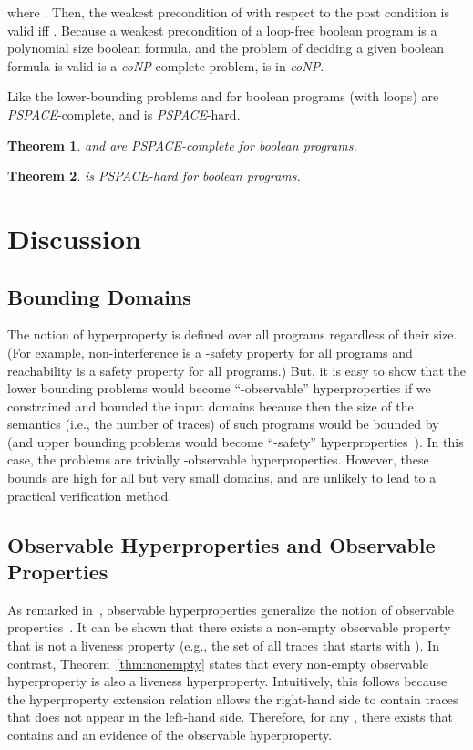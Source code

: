 \documentclass[]{eptcs}
\newtheorem{theorem}{Theorem}[section]
\begin{document}
where .  Then, the weakest precondition of
 with respect to the post
condition  is
valid iff .  Because a weakest precondition of a
loop-free boolean program is a polynomial size boolean formula, and
the problem of deciding a given boolean formula is valid is a {\it
  coNP}-complete problem,  is in {\it coNP}.

Like the lower-bounding problems  and
 for boolean programs (with loops) are {\it
  PSPACE}-complete, and  is {\it PSPACE}-hard.
\begin{theorem}
\label{thm:umeugepspace}
   and  are {\it
    PSPACE}-complete for boolean programs.
\end{theorem}
\begin{theorem}
\label{thm:usepspace}
 is {\it PSPACE}-hard for boolean programs.
\end{theorem}

\section{Discussion}

\subsection{Bounding Domains}

\label{sec:bounddomain}
The notion of hyperproperty is defined over all programs regardless of
their size. (For example, non-interference is a -safety property
for all programs and reachability is a safety property for all
programs.) But, it is easy to show that the lower bounding problems
would become ``-observable'' hyperproperties if we constrained and
bounded the input domains because then the size of the semantics
(i.e., the number of traces) of such programs would be bounded by
 (and upper bounding problems would become
``-safety''
hyperproperties~\cite{DBLP:conf/esorics/YasuokaT10}). In this case,
the problems are trivially -observable hyperproperties.
However, these bounds are high for all but very small domains, and are
unlikely to lead to a practical verification method.


\subsection{Observable Hyperproperties and Observable Properties}
As remarked in~\cite{DBLP:journals/jcs/ClarksonS10}, observable
hyperproperties generalize the notion of observable
properties~\cite{DBLP:journals/apal/Abramsky91}.  It can be shown that
there exists a non-empty observable property that is not a liveness
property (e.g., the set of all traces that starts with ).  In
contrast, Theorem~\ref{thm:nonempty} states that every non-empty
observable hyperproperty is also a liveness hyperproperty.
Intuitively, this follows because the hyperproperty extension relation
 allows the right-hand side to contain traces that does not
appear in the left-hand side.  Therefore, for any ,
there exists  that contains  and an evidence of
the observable hyperproperty.
\end{document}
